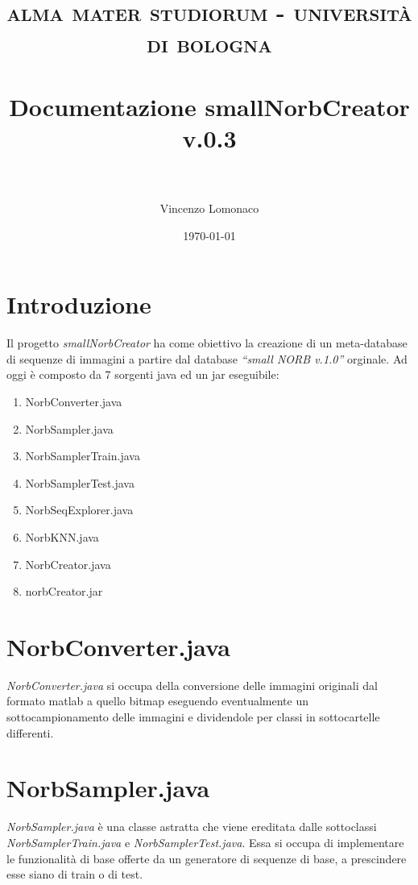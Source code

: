 \documentclass[paper=a4, fontsize=11pt]{scrartcl} %
\title{	
\normalfont \normalsize 
\textsc{alma mater studiorum - università di bologna} \\ [25pt] %
\horrule{0.5pt} \\[0.4cm] %
\huge Documentazione smallNorbCreator v.0.3 \\ %
\horrule{2pt} \\[0.5cm] %
}
\author{Vincenzo Lomonaco} %
\date{\normalsize\today} %
\numberwithin{equation}{section} %
\numberwithin{figure}{section} %
\numberwithin{table}{section} %
\begin{document}
\maketitle %


\section{Introduzione}

Il progetto \emph{smallNorbCreator} ha come obiettivo la creazione di un meta-database di sequenze di immagini a partire dal database \emph{``small NORB v.1.0''} orginale.
Ad oggi è composto da 7 sorgenti java ed un jar eseguibile:

\begin{enumerate}
	\item NorbConverter.java
	\item NorbSampler.java
	\item NorbSamplerTrain.java
	\item NorbSamplerTest.java 
	\item NorbSeqExplorer.java
	\item NorbKNN.java 
	\item NorbCreator.java
	\item norbCreator.jar
\end{enumerate}

\section{NorbConverter.java}
\emph{NorbConverter.java} si occupa della conversione delle immagini originali dal formato matlab a quello bitmap eseguendo eventualmente un sottocampionamento delle immagini e dividendole per classi in sottocartelle differenti.

\section{NorbSampler.java}
\emph{NorbSampler.java} è una classe astratta che viene ereditata dalle sottoclassi \emph{NorbSamplerTrain.java} e \emph{NorbSamplerTest.java}. Essa si occupa di implementare le funzionalità di base offerte da un generatore di sequenze di base, a prescindere esse siano di train o di test.
\end{document}
